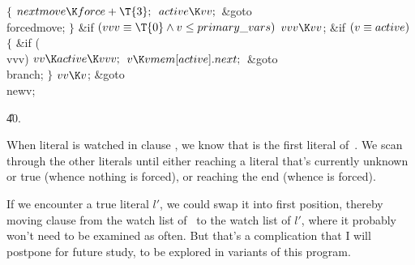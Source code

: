 ${}\{{}$\1\6
${}\\{nextmove}\K\\{force}+\T{3};{}$\6
${}\\{active}\K\\{vv};{}$\6
\&{goto} \\{forcedmove};\6
\4${}\}{}$\2\6
\&{if} ${}(\\{vvv}\E\T{0}\W\|v\Z\\{primary\_vars}){}$\1\5
${}\\{vvv}\K\\{vv}{}$;\2\6
\&{if} ${}(\|v\E\\{active}){}$\5
${}\{{}$\1\6
\&{if} (\\{vvv})\1\5
${}\\{vv}\K\\{active}\K\\{vvv};{}$\2\6
${}\|v\K\\{vmem}[\\{active}].\\{next};{}$\6
\&{goto} \\{branch};\6
\4${}\}{}$\2\6
${}\\{vv}\K\|v{}$;\5
\&{goto} \\{newv};\par
\U40.\fi

When literal  is watched in clause , we know that  is the first
literal of~. We scan through the other literals until either
reaching a literal that's currently unknown or true (whence nothing
is forced), or reaching the end (whence  is forced).

If we encounter a true literal $l'$, we could swap it into first position,
thereby moving clause  from the watch list of~ to the watch
list
of $l'$, where it probably won't need to be examined as often.
But that's a complication that I will postpone for future study,
to be explored in variants of this program.

